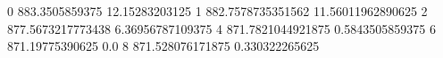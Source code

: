 0 883.3505859375 12.15283203125
1 882.7578735351562 11.56011962890625
2 877.5673217773438 6.36956787109375
4 871.7821044921875 0.5843505859375
6 871.19775390625 0.0
8 871.528076171875 0.330322265625
